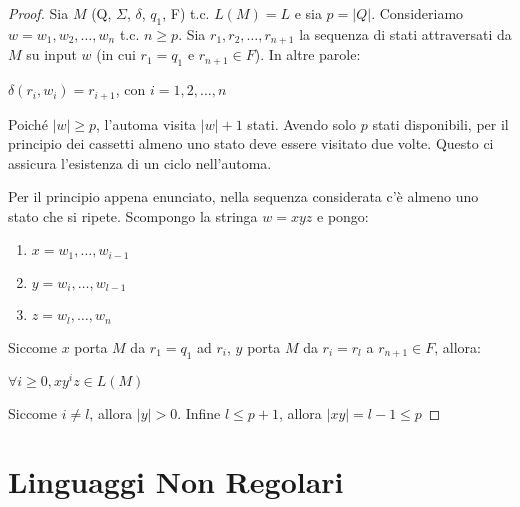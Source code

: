 \documentclass{article}
\begin{document}
\begin{proof}
    Sia $M$ (Q, $\Sigma$, $\delta$, $q_1$, F) t.c. $L(M)=L$ e sia $p=|Q|$. Consideriamo $w=w_1, w_2, \ldots, w_n$ t.c. $n\geq p$.
    \newline
    Sia $r_1,r_2, \ldots, r_{n+1}$ la sequenza di stati attraversati da $M$ su input $w$ (in cui $r_1=q_1$ e $r_{n+1} \in F$).
    \newline
    In altre parole:
    \begin{center}
        $\delta(r_i, w_i)=r_{i+1}$, con $i = 1,2, \ldots, n$
    \end{center}
    \begin{tcolorbox}[colback=blue!5, colframe=blue!60, title=Pigeonhole Principle]
        Poiché $|w| \ge p$, l’automa visita $|w|+1$ stati. 
        Avendo solo $p$ stati disponibili, per il principio dei cassetti almeno uno stato deve essere visitato due volte.  
        Questo ci assicura l’esistenza di un ciclo nell’automa.
        \end{tcolorbox}
    Per il principio appena enunciato, nella sequenza considerata c'è almeno uno stato che si ripete. 
    \newline
    Scompongo la stringa $w = xyz$ e pongo:
    \begin{enumerate}
        \item $x = w_1, \ldots, w_{i-1}$
        \item $y = w_i, \ldots, w_{l-1}$
        \item $z = w_l, \ldots, w_{n}$
    \end{enumerate}
    Siccome $x$ porta $M$ da $r_1=q_1$ ad $r_i$, $y$ porta $M$ da $r_i=r_l$ a $r_{n+1} \in F$, allora:
    \newline
    \begin{center}
        $\forall i \geq 0, xy^iz \in L(M)$
    \end{center}
    Siccome $i \neq l$, allora $|y|>0$.
    \newline
    Infine $l \leq p+1$, allora $|xy| = l-1 \leq p$
    
    
\end{proof}

\section{Linguaggi Non Regolari}
\end{document}
